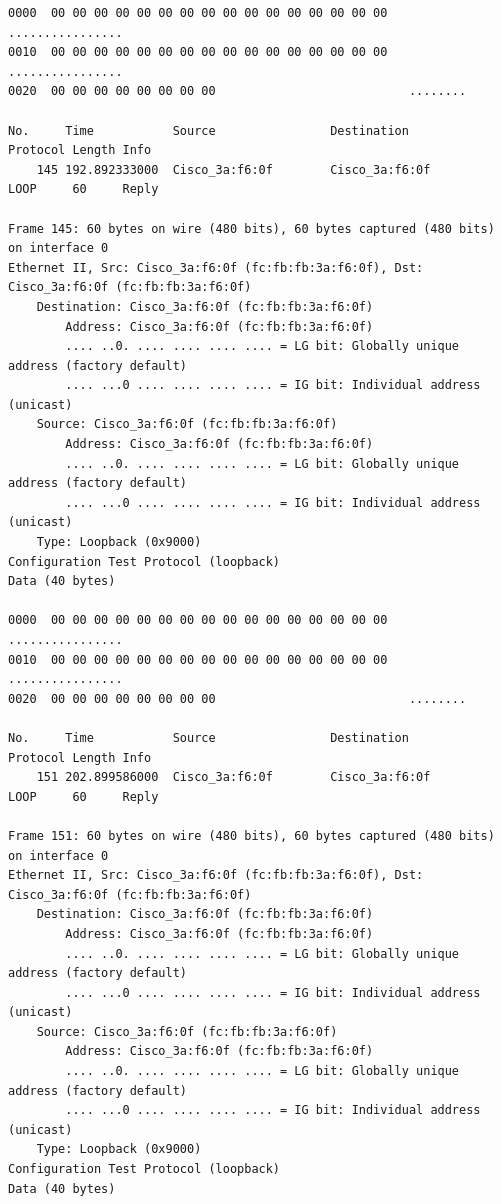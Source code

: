 \documentclass[a4paper,11pt]{article}
\begin{document}
\begin{lstlisting}
0000  00 00 00 00 00 00 00 00 00 00 00 00 00 00 00 00   ................
0010  00 00 00 00 00 00 00 00 00 00 00 00 00 00 00 00   ................
0020  00 00 00 00 00 00 00 00                           ........

No.     Time           Source                Destination           Protocol Length Info
    145 192.892333000  Cisco_3a:f6:0f        Cisco_3a:f6:0f        LOOP     60     Reply

Frame 145: 60 bytes on wire (480 bits), 60 bytes captured (480 bits) on interface 0
Ethernet II, Src: Cisco_3a:f6:0f (fc:fb:fb:3a:f6:0f), Dst: Cisco_3a:f6:0f (fc:fb:fb:3a:f6:0f)
    Destination: Cisco_3a:f6:0f (fc:fb:fb:3a:f6:0f)
        Address: Cisco_3a:f6:0f (fc:fb:fb:3a:f6:0f)
        .... ..0. .... .... .... .... = LG bit: Globally unique address (factory default)
        .... ...0 .... .... .... .... = IG bit: Individual address (unicast)
    Source: Cisco_3a:f6:0f (fc:fb:fb:3a:f6:0f)
        Address: Cisco_3a:f6:0f (fc:fb:fb:3a:f6:0f)
        .... ..0. .... .... .... .... = LG bit: Globally unique address (factory default)
        .... ...0 .... .... .... .... = IG bit: Individual address (unicast)
    Type: Loopback (0x9000)
Configuration Test Protocol (loopback)
Data (40 bytes)

0000  00 00 00 00 00 00 00 00 00 00 00 00 00 00 00 00   ................
0010  00 00 00 00 00 00 00 00 00 00 00 00 00 00 00 00   ................
0020  00 00 00 00 00 00 00 00                           ........

No.     Time           Source                Destination           Protocol Length Info
    151 202.899586000  Cisco_3a:f6:0f        Cisco_3a:f6:0f        LOOP     60     Reply

Frame 151: 60 bytes on wire (480 bits), 60 bytes captured (480 bits) on interface 0
Ethernet II, Src: Cisco_3a:f6:0f (fc:fb:fb:3a:f6:0f), Dst: Cisco_3a:f6:0f (fc:fb:fb:3a:f6:0f)
    Destination: Cisco_3a:f6:0f (fc:fb:fb:3a:f6:0f)
        Address: Cisco_3a:f6:0f (fc:fb:fb:3a:f6:0f)
        .... ..0. .... .... .... .... = LG bit: Globally unique address (factory default)
        .... ...0 .... .... .... .... = IG bit: Individual address (unicast)
    Source: Cisco_3a:f6:0f (fc:fb:fb:3a:f6:0f)
        Address: Cisco_3a:f6:0f (fc:fb:fb:3a:f6:0f)
        .... ..0. .... .... .... .... = LG bit: Globally unique address (factory default)
        .... ...0 .... .... .... .... = IG bit: Individual address (unicast)
    Type: Loopback (0x9000)
Configuration Test Protocol (loopback)
Data (40 bytes)


\end{lstlisting}
\end{document}
